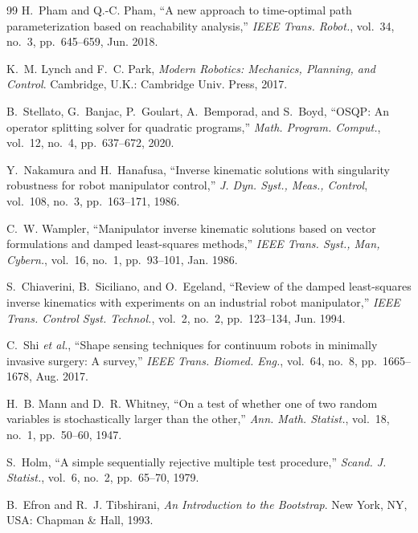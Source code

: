 \documentclass[journal]{IEEEtran}
\begin{document}
\begin{thebibliography}{99}
H.~Pham and Q.-C. Pham, ``A new approach to time-optimal path
parameterization based on reachability analysis,'' \emph{IEEE Trans.
Robot.}, vol.~34, no.~3, pp.~645--659, Jun. 2018.

K.~M. Lynch and F.~C. Park, \emph{Modern Robotics: Mechanics, Planning,
and Control}. Cambridge, U.K.: Cambridge Univ. Press, 2017.

B.~Stellato, G.~Banjac, P.~Goulart, A.~Bemporad, and S.~Boyd, ``OSQP: An
operator splitting solver for quadratic programs,'' \emph{Math. Program.
Comput.}, vol.~12, no.~4, pp.~637--672, 2020.

Y.~Nakamura and H.~Hanafusa, ``Inverse kinematic solutions with
singularity robustness for robot manipulator control,'' \emph{J. Dyn.
Syst., Meas., Control}, vol.~108, no.~3, pp.~163--171, 1986.

C.~W. Wampler, ``Manipulator inverse kinematic solutions based on vector
formulations and damped least-squares methods,'' \emph{IEEE Trans. Syst.,
Man, Cybern.}, vol.~16, no.~1, pp.~93--101, Jan. 1986.

S.~Chiaverini, B.~Siciliano, and O.~Egeland, ``Review of the damped
least-squares inverse kinematics with experiments on an industrial robot
manipulator,'' \emph{IEEE Trans. Control Syst. Technol.}, vol.~2, no.~2,
pp.~123--134, Jun. 1994.

C.~Shi \emph{et al.}, ``Shape sensing techniques for continuum robots in
minimally invasive surgery: A survey,'' \emph{IEEE Trans. Biomed. Eng.},
vol.~64, no.~8, pp.~1665--1678, Aug. 2017.

H.~B. Mann and D.~R. Whitney, ``On a test of whether one of two random
variables is stochastically larger than the other,'' \emph{Ann. Math.
Statist.}, vol.~18, no.~1, pp.~50--60, 1947.

S.~Holm, ``A simple sequentially rejective multiple test procedure,''
\emph{Scand. J. Statist.}, vol.~6, no.~2, pp.~65--70, 1979.

B.~Efron and R.~J. Tibshirani, \emph{An Introduction to the Bootstrap}.
New York, NY, USA: Chapman \& Hall, 1993.

\end{thebibliography}
\end{document}
